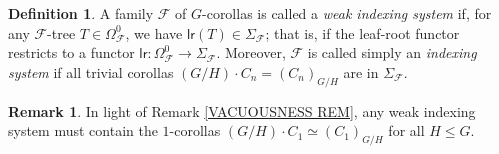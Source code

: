\documentclass[a4paper,10pt
,draft
]{article}%
\numberwithin{equation}{section}
\numberwithin{figure}{section}
\theoremstyle{definition} %
\newtheorem{definition}[equation]{Definition}%
\newtheorem{remark}[equation]{Remark}%
\newcommand{\Fin}{\mathsf{F}}%
\newcommand{\1}{\ensuremath{\mathbbm 1}}%
\begin{document}




\begin{definition}\label{INDEXSYS DEF}
	A family $\mathcal{F}$ of $G$-corollas is called a 
	\textit{weak indexing system} if,
	for any $\mathcal{F}$-tree $T \in \Omega_{\mathcal{F}}^0$,
	we have $\mathsf{lr}(T) \in \Sigma_{\mathcal{F}}$;
	that is, if the leaf-root functor restricts to a functor
	$\mathsf{lr} \colon \Omega_{\mathcal{F}}^0 \to \Sigma_{\mathcal{F}}$.
Moreover, $\mathcal{F}$ is called simply an \textit{indexing system} if all trivial corollas 
$(G/H)\cdot C_n = (C_n)_{G/H}$ are in $\Sigma_{\mathcal{F}}$.
\end{definition}


\begin{remark}
	In light of Remark \ref{VACUOUSNESS REM},
	any weak indexing system must contain the $1$-corollas $(G/H) \cdot C_1 \simeq (C_1)_{G/H}$ for all $H\leq G$.
\end{remark}
\end{document}
